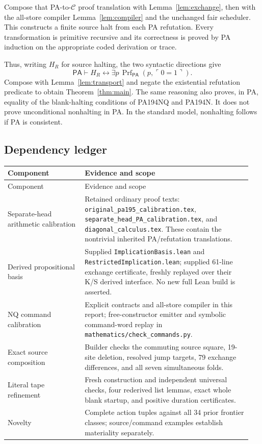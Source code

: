 \documentclass[10pt,letterpaper]{article}
\newcommand{\PA}{\mathsf{PA}}
\newcommand{\Prf}{\operatorname{Prf}}
\newcommand{\file}[1]{\nolinkurl{#1}}
\newcommand{\C}{\mathcal C}
\begin{document}
Compose that PA-to-\(\C\) proof translation with
Lemma~\ref{lem:exchange}, then with the all-store compiler
Lemma~\ref{lem:compiler} and the unchanged fair scheduler. This constructs
a finite source halt from each PA refutation. Every transformation is
primitive recursive and its correctness is proved by PA induction on the
appropriate coded derivation or trace.

Thus, writing \(H_R\) for source halting, the two syntactic directions give
\[
 \PA\vdash H_R\leftrightarrow
      \exists p\,\Prf_{\PA}(p,\ulcorner0=1\urcorner).
\]
Compose with Lemma~\ref{lem:transport} and negate the existential
refutation predicate to obtain Theorem~\ref{thm:main}. The same reasoning
also proves, in PA, equality of the blank-halting conditions of PA194NQ
and PA194N. It does not prove unconditional nonhalting in PA. In the
standard model, nonhalting follows if PA is consistent.

\subsection{Dependency ledger}

\begin{longtable}{@{}>{\raggedright\arraybackslash}p{0.30\linewidth}>{\raggedright\arraybackslash}p{0.65\linewidth}@{}}
\toprule Component & Evidence and scope\\\midrule\endfirsthead
\toprule Component & Evidence and scope\\\midrule\endhead
Separate-head arithmetic calibration & Retained ordinary proof texts:
\file{original_pa195_calibration.tex},
\file{separate_head_PA_calibration.tex}, and
\file{diagonal_calculus.tex}. These contain the nontrivial inherited
PA/refutation translations.\\[4pt]
Derived propositional basis & Supplied
\file{ImplicationBasis.lean} and \file{RestrictedImplication.lean}; supplied
61-line exchange certificate, freshly replayed over their K/S derived interface.
No new full Lean build is asserted.\\[4pt]
NQ command calibration & Explicit contracts and all-store compiler in this
report; free-constructor emitter and symbolic command-word replay in
\file{mathematics/check_commands.py}.\\[4pt]
Exact source composition & Builder checks the commuting source square,
19-site deletion, resolved jump targets, 79 exchange differences, and all
seven simultaneous folds.\\[4pt]
Literal tape refinement & Fresh construction and independent universal
checks, four rederived list lemmas, exact whole blank startup, and positive
duration certificates.\\[4pt]
Novelty & Complete action tuples against all 34 prior frontier classes;
source/command examples establish materiality separately.\\
\bottomrule
\end{longtable}
\end{document}
